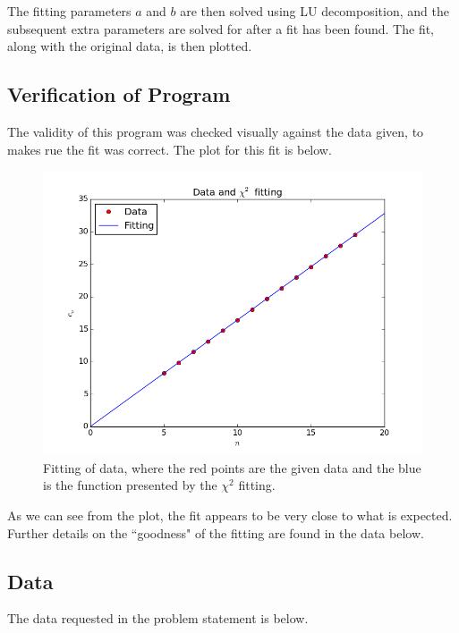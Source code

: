 \documentclass[10pt,letter]{article}
\begin{document}
The fitting parameters $a$ and $b$ are then solved using LU decomposition, and the subsequent extra parameters are solved for after a fit has been found. The fit, along with the original data, is then plotted.

\subsection{Verification of Program}

The validity of this program was checked visually against the data given, to makes rue the fit was correct. The plot for this fit is below.

\begin{figure}[h]
  \centering
    \includegraphics[width=.7\textwidth]{homework5_problem1_plot1}
  \caption{Fitting of data, where the red points are the given data and the blue is the function presented by the $\chi^2$ fitting.}
\end{figure}

As we can see from the plot, the fit appears to be very close to what is expected. Further details on the ``goodness" of the fitting are found in the data below.

\subsection{Data}

The data requested in the problem statement is below.
\end{document}
